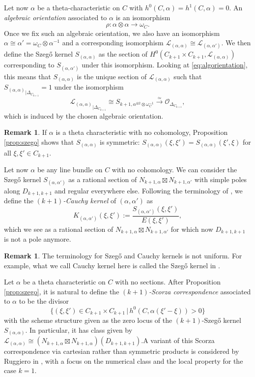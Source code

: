 \documentclass[12pt]{amsart}
\newcounter{thmcounter}
\numberwithin{equation}{section}
\numberwithin{thmcounter}{section}
\theoremstyle{definition}
\newtheorem{remark}[thmcounter]{Remark}
\theoremstyle{claim}
\newcommand{\sO}{\mathscr{O}}
\newcommand{\sL}{\mathscr{L}}
\begin{document}
Let now $\alpha$ be a theta-characteristic on $C$ with $h^0(C,\alpha)=h^1(C,\alpha)=0$. An \emph{algebraic orientation} associated to $\alpha$ is an isomorphism
\begin{equation}\label{eq:algorientation}
\rho\colon \alpha\otimes \alpha \longrightarrow \omega_C .
\end{equation}
Once we fix such an algebraic orientation, we also have an isomorphism $\alpha \cong \alpha' = \omega_C\otimes \alpha^{-1}$ and a corresponding isomorphism $\sL_{(\alpha,\alpha)} \cong \sL_{(\alpha,\alpha')}$. We then define the Szeg\H{o} kernel $S_{(\alpha,\alpha)}$ as the section of $H^0(C_{k+1}\times C_{k+1},\sL_{(\alpha,\alpha)})$ corresponding to $S_{(\alpha,\alpha')}$ under this isomorphism. Looking at \eqref{eq:algorientation}, this means that $S_{(\alpha,\alpha)}$ is the unique section of $\sL_{(\alpha,\alpha)}$ such that ${S_{(\alpha,\alpha)}}_{|\Delta_{C_{k+1}}} = 1$ under the isomorphism
\[ {\sL_{(\alpha,\alpha)}}_{|\Delta_{C_{k+1}}} \cong S_{k+1,\alpha^{\otimes 2} \otimes \omega_C^{-1}} \overset{\simeq}{\longrightarrow} \sO_{\Delta_{C_{k+1}}}, \]
which is induced by the chosen algebraic orientation.

\begin{remark}\label{rem:szegosymm}
 If $\alpha$ is a theta characteristic with no cohomology, Proposition \ref{prop:szego} shows that $S_{(\alpha,\alpha)}$ is symmetric: $S_{(\alpha,\alpha)}(\xi,\xi') = S_{(\alpha,\alpha)}(\xi',\xi)$ for all $\xi,\xi'\in C_{k+1}$.
\end{remark}

Let now $\alpha$ be any line bundle on $C$ with no cohomology. We can consider the Szeg\H{o}  kernel $S_{(\alpha,\alpha')}$ as a rational section of $N_{k+1,\alpha}\boxtimes N_{k+1,\alpha'}$ with simple poles along $D_{k+1,k+1}$ and regular everywhere else.  Following the terminology of \cite{shamovichvinnikov}, we define the \emph{$(k+1)$-Cauchy kernel} of $(\alpha,\alpha')$ as
\[ K_{(\alpha,\alpha')}(\xi,\xi') := \frac{S_{(\alpha,\alpha')}(\xi,\xi')}{E(\xi,\xi')}, \]
which we see as a rational section of $N_{k+1,\alpha}\boxtimes N_{k+1,\alpha'}$ for which now $D_{k+1,k+1}$ is not a pole anymore.

\begin{remark}
The terminology for Szeg\H{o} and Cauchy kernels is not uniform. For example, what we call Cauchy kernel here is called the Szeg\H{o} kernel in \cite{Fay,raina}.
\end{remark}

Let $\alpha$ be a theta characteristic on $C$ with no sections. After Proposition \ref{prop:szego}, it is natural to define the \emph{$(k+1)$-Scorza correspondence} associated to $\alpha$ to be the divisor
\[ \{(\xi,\xi') \in C_{k+1}\times C_{k+1}\,|\, h^0(C,\alpha(\xi'-\xi))>0\} \]
with the scheme structure given as the zero locus of the $(k+1)$-Szeg\H{o} kernel $S_{(\alpha,\alpha)}$. In particular, it has class given by $\sL_{(\alpha,\alpha)}\cong (N_{k+1,\alpha}\boxtimes N_{k+1,\alpha})(D_{k+1,k+1})$.A variant of this Scorza correspondence via cartesian rather than symmetric products is considered by Ruggiero in \cite{ruggiero}, with a focus on the numerical class and the local property for the case $k=1$.
\end{document}
